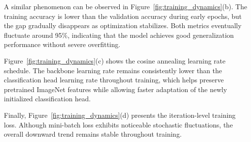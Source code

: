 A similar phenomenon can be observed in Figure~\ref{fig:training_dynamics}(b). The training accuracy is lower than the validation accuracy during early epochs, but the gap gradually disappears as optimization stabilizes. Both metrics eventually fluctuate around 95\%, indicating that the model achieves good generalization performance without severe overfitting.

Figure~\ref{fig:training_dynamics}(c) shows the cosine annealing learning rate schedule. The backbone learning rate remains consistently lower than the classification head learning rate throughout training, which helps preserve pretrained ImageNet features while allowing faster adaptation of the newly initialized classification head.

Finally, Figure~\ref{fig:training_dynamics}(d) presents the iteration-level training loss. Although mini-batch loss exhibits noticeable stochastic fluctuations, the overall downward trend remains stable throughout training.
